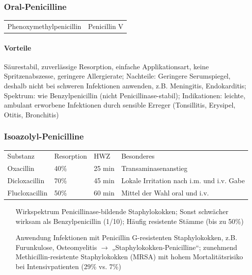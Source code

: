 \documentclass[10pt,a4paper]{report}
\begin{document}
\subsubsection{Oral-Penicilline} %
\label{ssub:oral_penicilline}
\begin{tabularx}{\textwidth}{XX}
Phenoxymethylpenicillin&Penicillin V\\
\end{tabularx}
\paragraph{Vorteile} %
\label{par:vorteile} Säurestabil, zuverlässige Resorption, einfache Applikationsart, keine Spritzenabszesse, geringere Allergierate; Nachteile: Geringere Serumspiegel, deshalb nicht bei schweren Infektionen anwenden, z.B. Meningitis, Endokarditis; Spektrum: wie Benzylpenicillin (nicht Penicillinase-stabil); Indikationen: leichte, ambulant erworbene Infektionen durch sensible Erreger (Tonsillitis, Erysipel, Otitis, Bronchitis) 
\subsubsection{Isoazolyl-Penicilline} %
\label{ssub:isoazolyl_penicilline}
\begin{tabularx}{\textwidth}{XXXX}
Substanz&Resorption&HWZ&Besonderes\\
Oxacillin&40\%&25 min&Transaminasenanstieg\\
Dicloxacillin&70\%&45 min&Lokale Irritation nach i.m. und i.v. Gabe\\
Flucloxacillin&50\%&60 min&Mittel der Wahl oral und i.v.\\
\end{tabularx}
\begin{itemize}
	\item[Wirkspektrum]Penicillinase-bildende Staphylokokken; Sonst schwächer wirksam als Benzylpenicillin (1/10); Häufig resistente Stämme (bis zu 50\%) 
	\item[Anwendung] Infektionen mit Penicillin G-resistenten Staphylokokken, z.B. Furunkulose, Osteomyelitis $\rightarrow$ „Staphylokokken-Penicilline“; zunehmend Methicillin-resistente Staphylokokken (MRSA) mit hohem Mortalitätsrisiko bei Intensivpatienten (29\% vs. 7\%)
\end{itemize}
\end{document}
